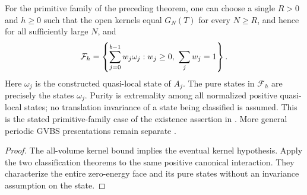 \begin{lemma}
    \label{thm:primitive_ground_state_face_interaction_exists}
    \leanok
    For the primitive family of the preceding theorem, one can choose a
    single $R>0$ and $h\geq0$ such that the open kernels equal $G_N(T)$
    for every $N\geq R$, and hence for all sufficiently large $N$, and
    \begin{align}
        \mathcal F_h
        =\left\{\sum_{j=0}^{b-1} w_j\omega_j:
        w_j\geq0,\ \sum_jw_j=1\right\}.
        \notag
    \end{align}
    Here $\omega_j$ is the constructed quasi-local state of $A_j$.
    The pure states in $\mathcal F_h$ are precisely the states $\omega_j$.
    Purity is extremality among all normalized positive quasi-local states;
    no translation invariance of a state being classified is assumed.
    This is the stated primitive-family case of the existence assertion in
    \cite[Theorem~1.1 and its finite-family consequence]{Nachtergaele1996Spectral}.
    More general periodic GVBS presentations remain separate
    \cite{gap:nachtergaele96_infinite_volume_ground_projection}.
\end{lemma}
\begin{proof}\leanok
    The all-volume kernel bound implies the eventual kernel hypothesis.
    Apply the two classification theorems to the same positive canonical
    interaction. They characterize the entire zero-energy face and its pure
    states without an invariance assumption on the state.
\end{proof}
